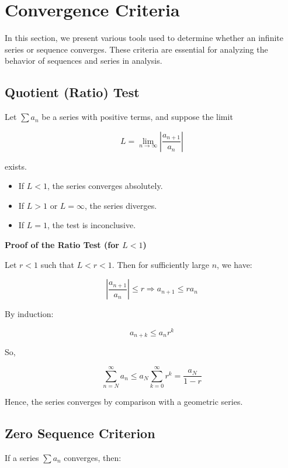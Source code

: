 \newpage
\section{Convergence Criteria}

In this section, we present various tools used to determine whether an infinite series or sequence converges. These criteria are essential for analyzing the behavior of sequences and series in analysis.

\subsection{Quotient (Ratio) Test}

Let \(\sum a_n\) be a series with positive terms, and suppose the limit

\[
  L = \lim_{n \to \infty} \left| \frac{a_{n+1}}{a_n} \right|
\]

exists.

\begin{itemize}
  
  \item If \(L < 1\), the series converges absolutely.

  \item If \(L > 1\) or \(L = \infty\), the series diverges.

  \item If \(L = 1\), the test is inconclusive.

\end{itemize}

\textbf{Proof of the Ratio Test (for \(L < 1\))}

Let \(r < 1\) such that \(L < r < 1\). Then for sufficiently large \(n\), we have:

\[
    \left| \frac{a_{n+1}}{a_n} \right| \le r \Rightarrow a_{n+1} \le r a_n
\]

By induction:

\[
    a_{n+k} \le a_n r^k
\]

So,

\[
    \sum_{n=N}^\infty a_n \le a_N \sum_{k=0}^\infty r^k = \frac{a_N}{1 - r}
\]

Hence, the series converges by comparison with a geometric series.

\subsection{Zero Sequence Criterion}

If a series \(\sum a_n\) converges, then:

